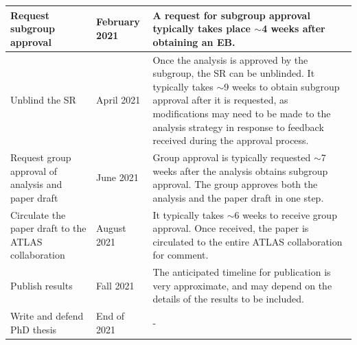 \documentclass[12pt]{article}
\begin{document}
\begin{table}[H]
\begin{footnotesize}
\begin{tabular}{|p{30mm}|p{20mm}|p{100mm}|}
Request subgroup approval   & February 2021 &  A request for subgroup approval typically takes place $\sim$4 weeks after obtaining an EB.     \\ \hline
Unblind the SR  & April 2021 & Once the analysis is approved by the subgroup, the SR can be unblinded. It typically takes $\sim$9 weeks to obtain subgroup approval after it is requested, as modifications may need to be made to the analysis strategy in response to feedback received during the approval process.    \\ \hline
Request group approval of analysis and paper draft & June 2021 & Group approval is typically requested $\sim$7 weeks after the analysis obtains subgroup approval. The group approves both the analysis and the paper draft in one step.  \\ \hline
Circulate the paper draft to the ATLAS collaboration & August 2021 & It typically takes $\sim$6 weeks to receive group approval. Once received, the paper is circulated to the entire ATLAS collaboration for comment. \\ \hline
Publish results & Fall 2021 & The anticipated timeline for publication is very approximate, and may depend on the details of the results to be included.  \\ \hline
Write and defend PhD thesis & End of 2021 & -  \\ \hline
\end{tabular}
\end{footnotesize}
\end{table}



\end{document}
